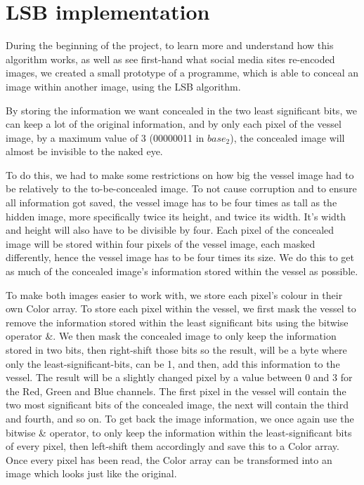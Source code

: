 \section{LSB implementation}
\label{sec:lsb-implementation}
During the beginning of the project, to learn more and understand how this algorithm works, as well as see first-hand what social media sites re-encoded images, we created a small prototype of a programme, which is able to conceal an image within another image, using the LSB algorithm. 

By storing the information we want concealed in the two least significant bits, we can keep a lot of the original information, and by only each pixel of the vessel image, by a maximum value of 3 (00000011 in $base_2$), the concealed image will almost be invisible to the naked eye.

To do this, we had to make some restrictions on how big the vessel image had to be relatively to the to-be-concealed image. To not cause corruption and to ensure all information got saved, the vessel image has to be four times as tall as the hidden image, more specifically twice its height, and twice its width. It's width and height will also have to be divisible by four. Each pixel of the concealed image will be stored within four pixels of the vessel image, each masked differently, hence the vessel image has to be four times its size. We do this to get as much of the concealed image's information stored within the vessel as possible.

To make both images easier to work with, we store each pixel's colour in their own Color array. To store each pixel within the vessel, we first mask the vessel to remove the information stored within the least significant bits using the bitwise operator \&. We then mask the concealed image to only keep the information stored in two bits, then right-shift those bits so the result, will be a byte where only the least-significant-bits, can be 1, and then, add this information to the vessel. The result will be a slightly changed pixel by a value between 0 and 3 for the Red, Green and Blue channels. The first pixel in the vessel will contain the two most significant bits of the concealed image, the next will contain the third and fourth, and so on. To get back the image information, we once again use the bitwise \& operator, to only keep the information within the least-significant bits of every pixel, then left-shift them accordingly and save this to a Color array. Once every pixel has been read, the Color array can be transformed into an image which looks just like the original.

